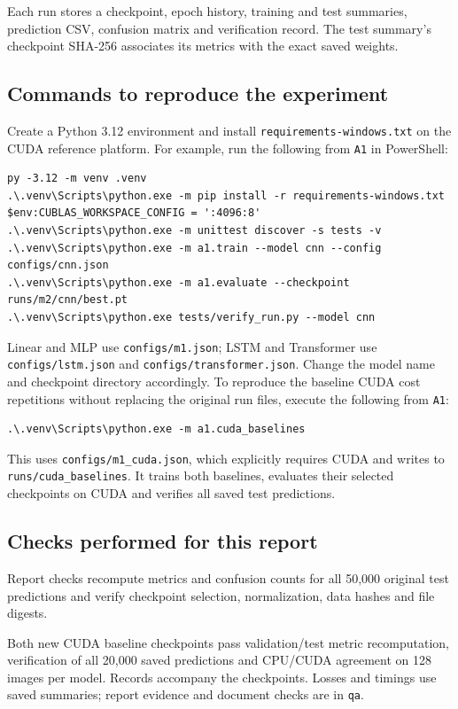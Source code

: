 Each run stores a checkpoint, epoch history, training and test summaries,
prediction CSV, confusion matrix and verification record. The test summary's
checkpoint SHA-256 associates its metrics with the exact saved weights.

\subsection{Commands to reproduce the experiment}
Create a Python 3.12 environment and install
\texttt{requirements-windows.txt} on the CUDA reference platform. For example,
run the following from \texttt{A1} in PowerShell:
\begingroup\footnotesize
\begin{verbatim}
py -3.12 -m venv .venv
.\.venv\Scripts\python.exe -m pip install -r requirements-windows.txt
$env:CUBLAS_WORKSPACE_CONFIG = ':4096:8'
.\.venv\Scripts\python.exe -m unittest discover -s tests -v
.\.venv\Scripts\python.exe -m a1.train --model cnn --config configs/cnn.json
.\.venv\Scripts\python.exe -m a1.evaluate --checkpoint runs/m2/cnn/best.pt
.\.venv\Scripts\python.exe tests/verify_run.py --model cnn
\end{verbatim}
\endgroup
Linear and MLP use \texttt{configs/m1.json}; LSTM and Transformer use
\texttt{configs/lstm.json} and \texttt{configs/transformer.json}.
Change the model name and checkpoint directory accordingly.
To reproduce the baseline CUDA cost repetitions without replacing the original
run files, execute the following from \texttt{A1}:
\begin{verbatim}
.\.venv\Scripts\python.exe -m a1.cuda_baselines
\end{verbatim}
This uses \texttt{configs/m1\_cuda.json}, which explicitly requires CUDA and
writes to \texttt{runs/cuda\_baselines}. It trains both baselines, evaluates
their selected checkpoints on CUDA and verifies all saved test predictions.

\subsection{Checks performed for this report}
Report checks recompute metrics and confusion counts for all 50,000 original
test predictions and verify checkpoint selection, normalization, data hashes
and file digests.

Both new CUDA baseline checkpoints pass validation/test metric recomputation,
verification of all 20,000 saved predictions and CPU/CUDA agreement on 128
images per model. Records accompany the checkpoints. Losses and timings use
saved summaries; report evidence and document checks are in \texttt{qa}.
